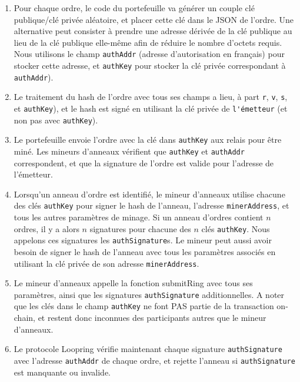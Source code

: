 \documentclass[UTF8,nofonts]{article}
\begin{document}
\begin{multicols}{2}
\begin{enumerate}

	\item Pour chaque ordre, le code du portefeuille va générer un couple clé publique/clé privée aléatoire, et placer cette clé dans le JSON de l'ordre. Une alternative peut consister à prendre une adresse dérivée de la clé publique au lieu de la clé publique elle-même afin de réduire le nombre d'octets requis. Nous utilisons le champ \verb|authAddr| (adresse d'autorisation en français) pour stocker cette adresse, et \verb|authKey| pour stocker la clé privée correspondant à \verb|authAddr|).

	\item Le traitement du hash de l'ordre avec tous ses champs a lieu, à part \verb|r|, \verb|v|, \verb|s|, et \verb|authKey|), et le hash est signé en utilisant la clé privée de \verb|l'émetteur| (et non pas avec \verb|authKey|).

	\item Le portefeuille envoie l'ordre avec la clé dans \verb|authKey| aux relais pour être miné. Les mineurs d'anneaux vérifient que \verb|authKey| et \verb|authAddr| correspondent, et que la signature de l'ordre est valide pour l'adresse de l'émetteur.

	\item Lorsqu'un anneau d'ordre est identifié, le mineur d'anneaux utilise chacune des clés \verb|authKey| pour signer le hash de l'anneau, l'adresse \verb|minerAddress|, et tous les autres paramètres de minage. Si un anneau d'ordres contient $n$ ordres, il y a alors $n$ signatures pour chacune des $n$ clés \verb|authKey|. Nous appelons ces signatures les \verb|authSignature|s. Le mineur peut aussi avoir besoin de signer le hash de l'anneau avec tous les paramètres associés en utilisant la clé privée de son adresse \verb|minerAddress|.

	\item Le mineur d'anneaux appelle la fonction submitRing avec tous ses paramètres, ainsi que les signatures \verb|authSignature| additionnelles. A noter que les clés dans le champ \verb|authKey| ne font PAS partie de la transaction on-chain, et restent donc inconnues des participants autres que le mineur d'anneaux.

	\item Le protocole Loopring vérifie maintenant chaque signature \verb|authSignature| avec l'adresse \verb|authAddr| de chaque ordre, et rejette l'anneau si \verb|authSignature| est manquante ou invalide.
 

\end{enumerate}
\end{multicols}
\end{document}
